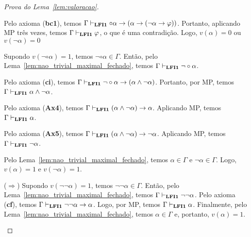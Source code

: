\begin{proof}[Prova do Lema~\ref{lem:valoracao}]
\begin{provaporcasos}
\begin{adjustwidth}{1cm}{}
                        \noindent Pelo axioma (\textbf{bc1}), temos $\Gamma \vdash_{{\normalfont\textbf{LFI1}}{}} \circ \alpha \to (\alpha \to (\neg \alpha \to \varphi))$. Portanto, aplicando MP três vezes, temos $\Gamma \vdash_{{\normalfont\textbf{LFI1}}{}} \varphi$, o que é uma contradição. Logo, $v(\alpha) = 0$ ou $v(\neg \alpha) = 0$
                    


                    \end{adjustwidth}
                

                    \begin{adjustwidth}{1cm}{}
                        
                        \noindent Supondo $v(\neg \circ \alpha) = 1$, temos $\neg \circ \alpha \in \Gamma$. Então, pelo Lema~\ref{lem:nao_trivial_maximal_fechado}, temos $\Gamma \vdash_{{\normalfont\textbf{LFI1}}{}} \neg \circ \alpha$.

                        Pelo axioma (\textbf{ci}), temos $\Gamma \vdash_{{\normalfont\textbf{LFI1}}{}} \neg \circ \alpha \to (\alpha \land \neg \alpha)$. Portanto, por MP, temos $\Gamma \vdash_{{\normalfont\textbf{LFI1}}{}} \alpha \land \neg \alpha$. 
                        
                        Pelo axioma (\textbf{Ax4}), temos $\Gamma \vdash_{{\normalfont\textbf{LFI1}}{}} (\alpha \land \neg \alpha) \to \alpha$. Aplicando MP, temos $\Gamma \vdash_{{\normalfont\textbf{LFI1}}{}} \alpha$.
                        
                        Pelo axioma (\textbf{Ax5}), temos $\Gamma \vdash_{{\normalfont\textbf{LFI1}}{}} (\alpha \land \neg \alpha) \to \neg \alpha$. Aplicando MP, temos $\Gamma \vdash_{{\normalfont\textbf{LFI1}}{}} \neg \alpha$.

                        Pelo Lema~\ref{lem:nao_trivial_maximal_fechado}, temos $\alpha \in \Gamma$ e $\neg \alpha \in \Gamma$. Logo, $v(\alpha) = 1$ e $v(\neg \alpha) = 1$.

                    \end{adjustwidth}


                    \begin{adjustwidth}{1cm}{}
                        
                        \noindent ($\Longrightarrow$) Supondo $v(\neg \neg \alpha) = 1$, temos $\neg \neg \alpha \in \Gamma$. Então, pelo Lema~\ref{lem:nao_trivial_maximal_fechado}, temos $\Gamma \vdash_{{\normalfont\textbf{LFI1}}{}} \neg \neg \alpha$. Pelo axioma (\textbf{cf}), temos $\Gamma \vdash_{{\normalfont\textbf{LFI1}}{}} \neg \neg \alpha \to \alpha$. Logo, por MP, temos $\Gamma \vdash_{{\normalfont\textbf{LFI1}}{}} \alpha$. Finalmente, pelo Lema~\ref{lem:nao_trivial_maximal_fechado}, temos $\alpha \in \Gamma$ e, portanto, $v(\alpha) = 1$.


\end{adjustwidth}
\end{provaporcasos}
\end{proof}
